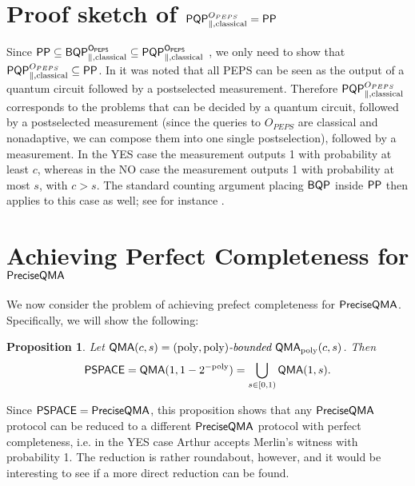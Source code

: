\documentclass[11pt]{article}
\newtheorem{theorem}{Theorem}
\newtheorem{proposition}[theorem]{Proposition}
\theoremstyle{definition}
\newtheorem{definition}[theorem]{Definition}
\theoremstyle{remark}
\newcommand\QMA{{\sf{QMA}}}
\newcommand\PSPACE{{\sf{PSPACE}}}
\newcommand\PP{\sf{PP}}
\newcommand\BQP{{\sf{BQP}}}
\newcommand\PQP{{\sf{PQP}}}
\newcommand\QMAexp{{\sf{PreciseQMA}}}
\newcommand\bddQMA[5]{{\left(#1,#2\right)}\textit{-bounded }\QMA_{#3}(#4,#5)}
\newcommand\revPSPACE{{\sf{revPSPACE}}}
\newcommand{\poly}{\textrm{poly}}
\begin{document}
\section{Proof sketch of $\PQP^{O_{PEPS}}_{\parallel,\text{classical}} = \PP$} \label{app:peps}
Since $\PP \subseteq \BQP^{O_{PEPS}}_{\parallel,\text{classical}} \subseteq \PQP^{O_{PEPS}}_{\parallel,\text{classical}}$ \cite{swv07}, we only need to show that $\PQP^{O_{PEPS}}_{\parallel,\text{classical}} \subseteq \PP$. In \cite{swv07} it was noted that all PEPS can be seen as the output of a quantum circuit followed by a postselected measurement. Therefore $\PQP^{O_{PEPS}}_{\parallel,\text{classical}}$ corresponds to the problems that can be decided by a quantum circuit, followed by a postselected measurement (since the queries to $O_{PEPS}$ are classical and nonadaptive, we can compose them into one single postselection), followed by a measurement. In the YES case the measurement outputs 1 with probability at least $c$, whereas in the NO case the measurement outputs 1 with probability at most $s$, with $c > s$. The standard counting argument placing $\BQP$ inside $\PP$ then applies to this case as well; see for instance \cite[Propositions~2~and~3]{aaronson05}.
\section{Achieving Perfect Completeness for $\QMAexp$}\label{app:perfectcompleteness}
%
We now consider the problem of achieving prefect completeness for $\QMAexp$. Specifically, we will show the following:
\begin{proposition} Let $\QMA(c,s) = \bddQMA{\poly}{\poly}{\poly}{c}{s}$. Then
\[
\PSPACE = \QMA(1,1-2^{-\poly}) = \bigcup_{s \in [0,1)}\QMA(1,s).
\]
\end{proposition}
Since $\PSPACE = \QMAexp$, this proposition shows that any $\QMAexp$ protocol can be reduced to a different $\QMAexp$ protocol with perfect completeness, i.e. in the YES case Arthur accepts Merlin's witness with probability 1. The reduction is rather roundabout, however, and it would be interesting to see if a more direct reduction can be found.
\end{document}

